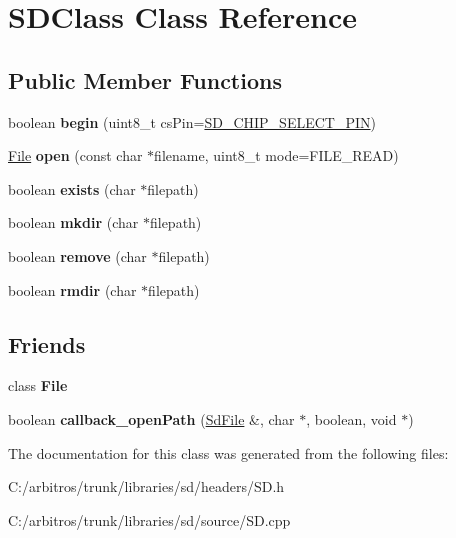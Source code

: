 \hypertarget{class_s_d_class}{\section{S\-D\-Class Class Reference}
\label{class_s_d_class}
}
\subsection*{Public Member Functions}
\begin{DoxyCompactItemize}
\item 
\hypertarget{class_s_d_class_a16237a94c8a7a37f5be178336442e75d}{boolean {\bfseries begin} (uint8\-\_\-t cs\-Pin=\hyperlink{_sd2_card_8h_ae6b17538c14ba6c91ccb513db2c4c29c}{S\-D\-\_\-\-C\-H\-I\-P\-\_\-\-S\-E\-L\-E\-C\-T\-\_\-\-P\-I\-N})}\label{class_s_d_class_a16237a94c8a7a37f5be178336442e75d}

\item 
\hypertarget{class_s_d_class_a29c544723a93e3f014ae1e1ca35ccd62}{\hyperlink{class_file}{File} {\bfseries open} (const char $\ast$filename, uint8\-\_\-t mode=F\-I\-L\-E\-\_\-\-R\-E\-A\-D)}\label{class_s_d_class_a29c544723a93e3f014ae1e1ca35ccd62}

\item 
\hypertarget{class_s_d_class_a144d209d6ec9521fda43deb02a744912}{boolean {\bfseries exists} (char $\ast$filepath)}\label{class_s_d_class_a144d209d6ec9521fda43deb02a744912}

\item 
\hypertarget{class_s_d_class_a28f50dad281fdecf8812f6408b33351e}{boolean {\bfseries mkdir} (char $\ast$filepath)}\label{class_s_d_class_a28f50dad281fdecf8812f6408b33351e}

\item 
\hypertarget{class_s_d_class_aa83104b911de5631f4d706d783dfb717}{boolean {\bfseries remove} (char $\ast$filepath)}\label{class_s_d_class_aa83104b911de5631f4d706d783dfb717}

\item 
\hypertarget{class_s_d_class_a03606afe699cdf6fec80728d48ad45b9}{boolean {\bfseries rmdir} (char $\ast$filepath)}\label{class_s_d_class_a03606afe699cdf6fec80728d48ad45b9}

\end{DoxyCompactItemize}
\subsection*{Friends}
\begin{DoxyCompactItemize}
\item 
\hypertarget{class_s_d_class_a68d15876ad188b7628261b12d0eac8aa}{class {\bfseries File}}\label{class_s_d_class_a68d15876ad188b7628261b12d0eac8aa}

\item 
\hypertarget{class_s_d_class_a8446a505a6d0edaccab9e8ff4002eae4}{boolean {\bfseries callback\-\_\-open\-Path} (\hyperlink{class_sd_file}{Sd\-File} \&, char $\ast$, boolean, void $\ast$)}\label{class_s_d_class_a8446a505a6d0edaccab9e8ff4002eae4}

\end{DoxyCompactItemize}


The documentation for this class was generated from the following files\-:\begin{DoxyCompactItemize}
\item 
C\-:/arbitros/trunk/libraries/sd/headers/S\-D.\-h\item 
C\-:/arbitros/trunk/libraries/sd/source/S\-D.\-cpp\end{DoxyCompactItemize}
